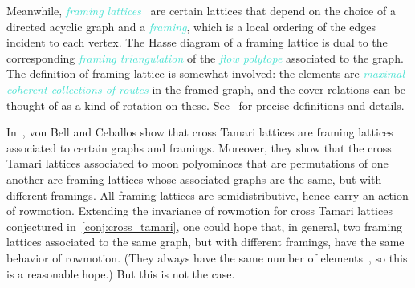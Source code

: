 \documentclass[11pt]{amsart}
\newcommand{\dfn}[1]{\textcolor{Turquoise}{\emph{#1}}}
\theoremstyle{definition}
\begin{document}
Meanwhile, \dfn{framing lattices}~\cite{vonbell2025framing} are certain lattices that depend on the choice of a directed acyclic graph and a \dfn{framing}, which is a local ordering of the edges incident to each vertex. The Hasse diagram of a framing lattice is dual to the corresponding \dfn{framing triangulation} of the \dfn{flow polytope} associated to the graph. The definition of framing lattice is somewhat involved: the elements are \dfn{maximal coherent collections of routes} in the framed graph, and the cover relations can be thought of as a kind of rotation on these. See~\cite{vonbell2025framing} for precise definitions and details.

In~\cite[\S2.4]{vonbell2025framing}, von Bell and Ceballos show that cross Tamari lattices are framing lattices associated to certain graphs and framings. Moreover, they show that the cross Tamari lattices associated to moon polyominoes that are permutations of one another are framing lattices whose associated graphs are the same, but with different framings. All framing lattices are semidistributive, hence carry an action of rowmotion. Extending the invariance of rowmotion for cross Tamari lattices conjectured in~\cref{conj:cross_tamari}, one could hope that, in general, two framing lattices associated to the same graph, but with different framings, have the same behavior of rowmotion. (They always have the same number of elements~\cite{vonbell2025framing}, so this is a reasonable hope.) But this is not the case.
\end{document}
